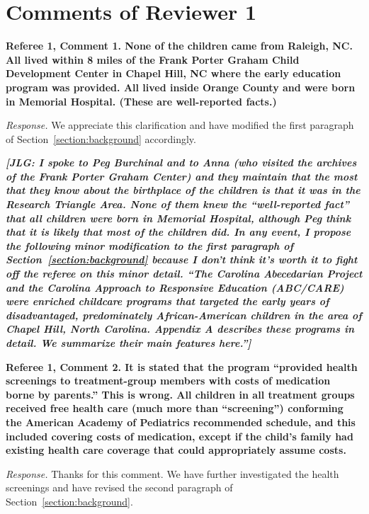 \section*{Comments of Reviewer 1}

\noindent \textbf{Referee 1, Comment 1. None of the children came from Raleigh, NC. All lived within 8 miles of the Frank Porter Graham Child Development Center in Chapel Hill, NC where the early education program was provided. All lived inside Orange County and were born in Memorial Hospital. (These are well-reported facts.)}

\noindent \textit{Response.} We appreciate this clarification and have modified the first paragraph of Section~\ref{section:background} accordingly.

\textit{\textbf{[JLG: I spoke to Peg Burchinal and to Anna (who visited the archives of the Frank Porter Graham Center) and they maintain that the most that they know about the birthplace of the children is that it was in the Research Triangle Area. None of them knew the ``well-reported fact'' that all children were born in Memorial Hospital, although Peg think that it is likely that most of the children did. In any event, I propose the following minor modification to the first paragraph of Section~\ref{section:background} because I don't think it's worth it to fight off the referee on this minor detail. ``The Carolina Abecedarian Project and the Carolina Approach to Responsive Education (ABC/CARE) were enriched childcare programs that targeted the early years of disadvantaged, predominately African-American children in the area of Chapel Hill, North Carolina. Appendix A describes these programs in detail. We summarize their main features here.'']}}

\noindent \textbf{Referee 1, Comment 2. It is stated that the program ``provided health screenings to treatment-group members with costs of medication borne by parents.'' This is wrong. All children in all treatment groups received free health care (much more than ``screening'') conforming the American Academy of Pediatrics recommended schedule, and this included covering costs of medication, except if the child's family had existing health care coverage that could appropriately assume costs.}

\noindent \textit{Response.} Thanks for this comment. We have further investigated the health screenings and have revised the second paragraph of Section~\ref{section:background}.

